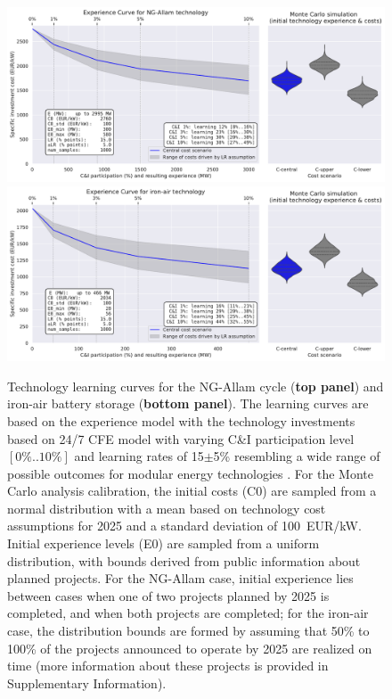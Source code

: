 \documentclass[pdflatex,sn-basic, Numbered]{sn-jnl}
\theoremstyle{thmstyleone}%
\theoremstyle{thmstyletwo}%
\theoremstyle{thmstylethree}%
\begin{document}
\begin{figure}[htbp]
    \centering
    \includegraphics[width=\textwidth]{images/e_curve_NG-Allam.pdf}
    \includegraphics[width=\textwidth]{images/e_curve_iron-air.pdf}
    \caption{Technology learning curves for the NG-Allam cycle (\textbf{top panel}) and iron-air battery storage (\textbf{bottom panel}).
    The learning curves are based on the experience model with the technology investments based on 24/7 CFE model with varying C\&I participation level $[0\%..10\%]$ and learning rates of 15$\pm$5\% resembling a wide range of possible outcomes for modular energy technologies \cite{waySuppplementaryMaterialsEmpirically2022}. For the Monte Carlo analysis calibration, the initial costs (C0) are sampled from a normal distribution with a mean based on technology cost assumptions for 2025 and a standard deviation of 100~EUR/kW. Initial experience levels (E0) are sampled from a uniform distribution, with bounds derived from public information about planned projects. For the NG-Allam case, initial experience lies between cases when one of two projects planned by 2025 is completed, and when both projects are completed; for the iron-air case, the distribution bounds are formed by assuming that 50\% to 100\% of the projects announced to operate by 2025 are realized on time (more information about these projects is provided in Supplementary Information).
    }
    \label{fig:panels}
\end{figure}
\end{document}
